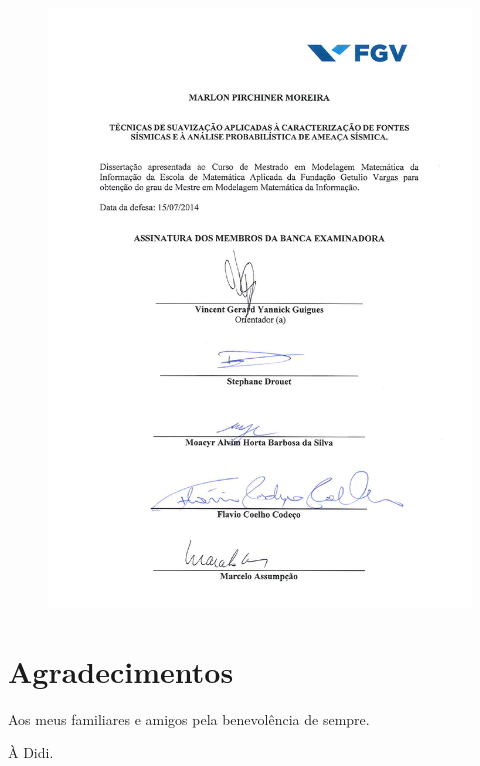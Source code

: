 \documentclass[12pt,twoside,a4paper]{book}
\numberwithin{equation}{section}
\begin{document}
	\begin{figure}[H]
	  \centering
	  \includegraphics[width=\textwidth]{_signatures} 
	\end{figure}

\pagebreak




\chapter*{Agradecimentos}
Aos meus familiares e amigos pela benevolência de sempre.

À Didi.
\end{document}
